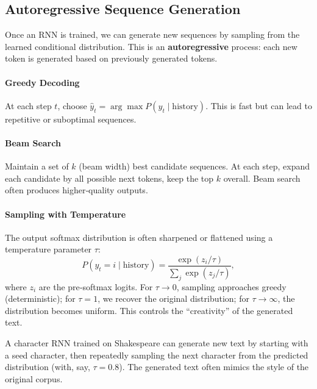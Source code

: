 \documentclass{tufte-handout}
\begin{document}
\subsection{Autoregressive Sequence Generation}

Once an RNN is trained, we can generate new sequences by sampling from the learned conditional distribution. This is an \textbf{autoregressive} process: each new token is generated based on previously generated tokens.

\paragraph{Greedy Decoding}
At each step $t$, choose $\hat{y}_t = \arg\max P(y_t \mid \text{history})$. This is fast but can lead to repetitive or suboptimal sequences.

\paragraph{Beam Search}
Maintain a set of $k$ (beam width) best candidate sequences. At each step, expand each candidate by all possible next tokens, keep the top $k$ overall. Beam search often produces higher‑quality outputs.

\paragraph{Sampling with Temperature}
The output softmax distribution is often sharpened or flattened using a temperature parameter $\tau$:
\[
P(y_t = i \mid \text{history}) = \frac{\exp(z_i / \tau)}{\sum_j \exp(z_j / \tau)},
\]
where $z_i$ are the pre‑softmax logits. For $\tau \to 0$, sampling approaches greedy (deterministic); for $\tau = 1$, we recover the original distribution; for $\tau \to \infty$, the distribution becomes uniform. This controls the “creativity” of the generated text.

\begin{exmp}
    A character RNN trained on Shakespeare can generate new text by starting with a seed character, then repeatedly sampling the next character from the predicted distribution (with, say, $\tau = 0.8$). The generated text often mimics the style of the original corpus.
\end{exmp}

\begin{marginfigure}
\centering
{}
\caption{As temperature $\tau$ increases, the sampling distribution becomes more uniform (higher entropy).}
\end{marginfigure}
\end{document}
